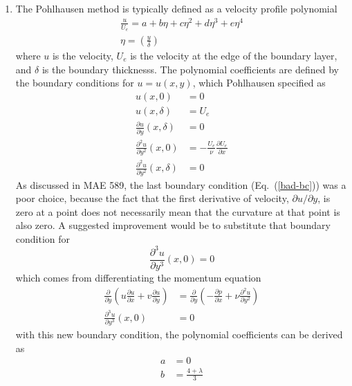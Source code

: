 \documentclass[a4paper]{article}
\newcommand{\eref}[1]{Eq.~(\ref{#1})}
\newcommand{\pd}[2]{\frac{\partial #1}{\partial #2}}
\newcommand{\pnd}[3]{\frac{\partial^{#3} #1}{\partial #2^{#3}}}
\begin{document}
\begin{enumerate}
  \item The Pohlhausen method is typically defined as a velocity profile polynomial
    \begin{equation}
      \begin{gathered}
        \frac{u}{U_e} = a + b\eta + c\eta^2 + d\eta^3 + e\eta^4 \\
        \eta = \left( \frac{y}{\delta} \right)
      \end{gathered}
      \label{u-polynomial}
    \end{equation}
    where $u$ is the velocity, $U_e$ is the velocity at the edge of the
    boundary layer, and $\delta$ is the boundary thicknesss.  The polynomial
    coefficients are defined by the boundary conditions for $u = u(x,y)$, which
    Pohlhausen specified as
    \begin{align}
      u(x,0) &= 0 \\
      u(x,\delta) &= U_e \\
      \pd{u}{y}(x,\delta) &= 0 \\
      \pnd{u}{y}{2}(x,0) &=
      -\frac{U_e}{\nu}\pd{U_e}{x} \\
      \pnd{u}{y}{2}(x,\delta) &= 0 \label{bad-bc}
    \end{align}
    As discussed in MAE 589, the last boundary condition (\eref{bad-bc}) was a
    poor choice, because the fact that the first derivative of velocity, $\partial
    u/\partial y$, is zero at a point does not necessarily mean that the
    curvature at that point is also zero.  A suggested improvement would be to
    substitute that boundary condition for
    \begin{equation}
      \pnd{u}{y}{3}(x,0) = 0
      \label{improved-bc}
    \end{equation}
    which comes from differentiating the momentum equation
    \begin{equation}
      \begin{aligned}
        \pd{}{y}\left( u \pd{u}{x} + v\pd{u}{y}\right) &= \pd{}{y}\left(
        -\pd{p}{x} + \nu \pnd{u}{y}{2} \right) \\
        \pnd{u}{y}{3}(x,0) &= 0
      \end{aligned}
      \label{bc-deriv}
    \end{equation}
    with this new boundary condition, the polynomial coefficients can be derived
    as
    \begin{align}
      a &= 0 \\
      b &= \frac{4 + \lambda}{3} \\

\end{align}
\end{enumerate}
\end{document}
